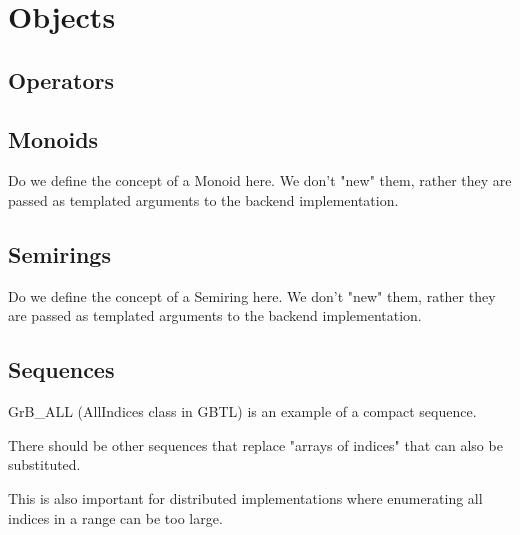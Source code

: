 \chapter{Objects}
\label{Chp:Objects}


\section{Operators}


\section{Monoids}

Do we define the concept of a Monoid here.  We don't "new" them, rather they
are passed as templated arguments to the backend implementation.




\section{Semirings}

Do we define the concept of a Semiring here.  We don't "new" them, rather they
are passed as templated arguments to the backend implementation.



\section{Sequences}
\label{Sec:Sequences}

{\sf GrB\_ALL} (AllIndices class in GBTL) is an example of a compact sequence.

There should be other sequences that replace "arrays of indices" that can also be substituted.

This is also important for distributed implementations where enumerating all indices in a range can be too large.

